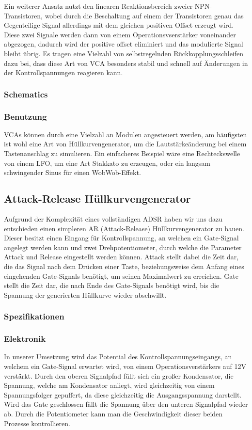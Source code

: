Ein weiterer Ansatz nutzt den linearen Reaktionsbereich zweier NPN-Transistoren, wobei durch die Beschaltung auf einem der Transistoren genau das Gegenteilige Signal allerdings mit dem gleichen positiven Offset erzeugt wird. Diese zwei Signale werden dann von einem Operationsvserstärker voneinander abgezogen, dadurch wird der positive offset eliminiert und das modulierte Signal bleibt übrig. Es tragen eine Vielzahl von selbstregelnden Rückkopplungsschleifen dazu bei, dass diese Art von VCA besonders stabil und schnell auf Änderungen in der Kontrollspannungen reagieren kann.
\subsubsection{Schematics}
\label{sec:orgdab7085}
\subsubsection{Benutzung}
\label{sec:orge904f2a}
VCAs können durch eine Vielzahl an Modulen angesteuert werden, am häufigsten ist wohl eine Art von Hüllkurvengenerator, um die Lautstärkeänderung bei einem Tastenanschlag zu simulieren. Ein einfacheres Beispiel wäre eine Rechteckswelle von einem LFO, um eine Art Stakkato zu erzeugen, oder ein langsam schwingender Sinus für einen WobWob-Effekt.

\subsection{Attack-Release Hüllkurvengenerator}
\label{sec:orgd95d4fc}
Aufgrund der Komplexität eines vollständigen ADSR haben wir uns dazu entschieden einen simpleren AR (Attack-Release) Hüllkurvengenerator zu bauen. Dieser besitzt einen Eingang für Kontrollspannung, an welchen ein Gate-Signal angelegt werden kann und zwei Drehpotentiometer, durch welche die Parameter Attack und Release eingestellt werden können. Attack stellt dabei die Zeit dar, die das Signal nach dem Drücken einer Taste, beziehungsweise dem Anfang eines eingehenden Gate-Signals benötigt, um seinen Maximalwert zu erreichen. Gate stellt die Zeit dar, die nach Ende des Gate-Signals benötigt wird, bis die Spannung der generierten Hüllkurve wieder abschwillt.

\subsubsection{Spezifikationen}
\label{sec:orgaa437ad}
\subsubsection{Elektronik}
\label{sec:org722a77d}
In unserer Umsetzung wird das Potential des Kontrollspannungseingangs, an welchem ein Gate-Signal erwartet wird, von einem Operationsverstärkers auf 12V verstärkt. Durch den oberen Signalpfad füllt sich ein großer Kondensator, die Spannung, welche am Kondensator anliegt, wird gleichzeitig von einem Spannungsfolger gepuffert, da diese gleichzeitig die Ausgangsspannung darstellt. Wird das Gate geschlossen fällt die Spannung über den unteren Signalpfad wieder ab. Durch die Potentiometer kann man die Geschwindigkeit dieser beiden Prozesse kontrollieren.
